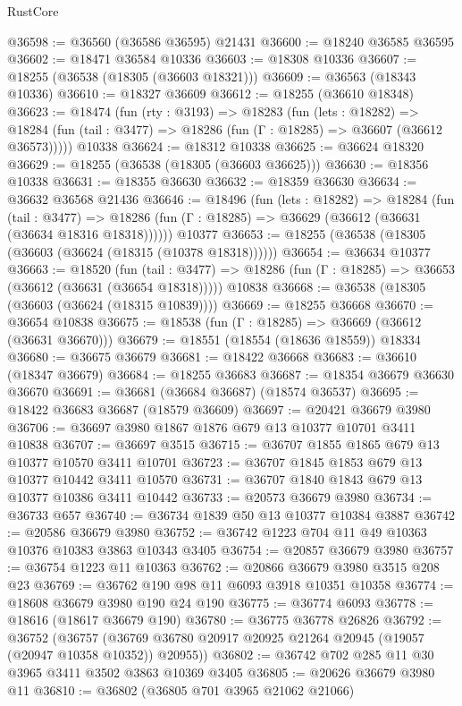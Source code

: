 \begin{lexlean}{RustCore}
\begin{coremodule}
@36598 := @36560 (@36586 @36595) @21431
@36600 := @18240 @36585 @36595
@36602 := @18471 @36584 @10336
@36603 := @18308 @10336
@36607 := @18255 (@36538 (@18305 (@36603 @18321)))
@36609 := @36563 (@18343 @10336)
@36610 := @18327 @36609
@36612 := @18255 (@36610 @18348)
@36623 := @18474
    (fun (rty : @3193) =>
    @18283
      (fun (lets : @18282) =>
      @18284 (fun (tail : @3477) => @18286 (fun (Γ : @18285) => @36607 (@36612 @36573)))))
    @10338
@36624 := @18312 @10338
@36625 := @36624 @18320
@36629 := @18255 (@36538 (@18305 (@36603 @36625)))
@36630 := @18356 @10338
@36631 := @18355 @36630
@36632 := @18359 @36630
@36634 := @36632 @36568 @21436
@36646 := @18496
    (fun (lets : @18282) =>
    @18284
      (fun (tail : @3477) =>
      @18286 (fun (Γ : @18285) => @36629 (@36612 (@36631 (@36634 @18316 @18318))))))
    @10377
@36653 := @18255 (@36538 (@18305 (@36603 (@36624 (@18315 (@10378 @18318))))))
@36654 := @36634 @10377
@36663 := @18520
    (fun (tail : @3477) => @18286 (fun (Γ : @18285) => @36653 (@36612 (@36631 (@36654 @18318)))))
    @10838
@36668 := @36538 (@18305 (@36603 (@36624 (@18315 @10839))))
@36669 := @18255 @36668
@36670 := @36654 @10838
@36675 := @18538 (fun (Γ : @18285) => @36669 (@36612 (@36631 @36670)))
@36679 := @18551 (@18554 (@18636 @18559)) @18334
@36680 := @36675 @36679
@36681 := @18422 @36668
@36683 := @36610 (@18347 @36679)
@36684 := @18255 @36683
@36687 := @18354 @36679 @36630 @36670
@36691 := @36681 (@36684 @36687) (@18574 @36537)
@36695 := @18422 @36683 @36687 (@18579 @36609)
@36697 := @20421 @36679 @3980
@36706 := @36697 @3980 @1867 @1876 @679 @13 @10377 @10701 @3411 @10838
@36707 := @36697 @3515
@36715 := @36707 @1855 @1865 @679 @13 @10377 @10570 @3411 @10701
@36723 := @36707 @1845 @1853 @679 @13 @10377 @10442 @3411 @10570
@36731 := @36707 @1840 @1843 @679 @13 @10377 @10386 @3411 @10442
@36733 := @20573 @36679 @3980
@36734 := @36733 @657
@36740 := @36734 @1839 @50 @13 @10377 @10384 @3887
@36742 := @20586 @36679 @3980
@36752 := @36742 @1223 @704 @11 @49 @10363 @10376 @10383 @3863 @10343 @3405
@36754 := @20857 @36679 @3980
@36757 := @36754 @1223 @11 @10363
@36762 := @20866 @36679 @3980 @3515 @208 @23
@36769 := @36762 @190 @98 @11 @6093 @3918 @10351 @10358
@36774 := @18608 @36679 @3980 @190 @24 @190
@36775 := @36774 @6093
@36778 := @18616 (@18617 @36679 @190)
@36780 := @36775 @36778 @26826
@36792 := @36752
    (@36757 (@36769 @36780 @20917 @20925 @21264 @20945 (@19057 (@20947 @10358 @10352)) @20955))
@36802 := @36742 @702 @285 @11 @30 @3965 @3411 @3502 @3863 @10369 @3405
@36805 := @20626 @36679 @3980 @11
@36810 := @36802 (@36805 @701 @3965 @21062 @21066)

\end{coremodule}
\end{lexlean}
